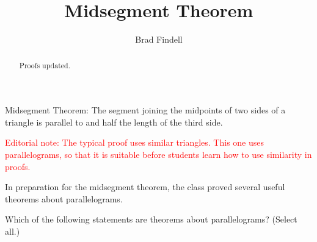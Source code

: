 \documentclass[nooutcomes]{ximera}
\title{Midsegment Theorem}
\author{Brad Findell}
\begin{document}
\begin{abstract}
Proofs updated.
\end{abstract}
\maketitle


\begin{theorem}
Midsegment Theorem: The segment joining the midpoints of two sides of a triangle is parallel to and half the length of the third side.
\end{theorem}

{\textcolor{red}{Editorial note:  The typical proof uses similar triangles.  This one uses parallelograms, so that it is suitable before students learn how to use similarity in proofs.}}

\begin{question}
In preparation for the midsegment theorem, the class proved several useful theorems about parallelograms. 

Which of the following statements are theorems about parallelograms?  (Select all.)
\begin{selectAll}
\end{selectAll}
\end{question}
\end{document}
